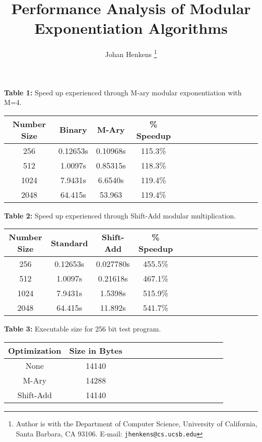 \documentclass[twocolumn]{IEEEtran}
\begin{document}
\title{Performance Analysis of Modular \break
Exponentiation Algorithms}


\author{Johan Henkens
\thanks{Author is with the
Department of Computer Science,
University of California, Santa Barbara, CA 93106.
E-mail: \texttt{jhenkens@cs.ucsb.edu}}
}

\maketitle



\begin{center}
\textbf{Table 1:} Speed up experienced through M-ary modular exponentiation with M=4. \\[1em]
\begin{tabular}{|c|c|c|c|c|c|c|c|c|c|c|c|c|c|} \hline
Number Size & Binary & M-Ary & \% Speedup  \\ \hline
256 	& 0.12653s 	& 0.10968s	& 115.3\% \\ \hline
512 	& 1.0097s  	& 0.85315s	& 118.3\% \\ \hline
1024 	& 7.9431s  	& 6.6540s	& 119.4\% \\ \hline
2048 	& 64.415s  	& 53.963	& 119.4\% \\ \hline
\end{tabular}
\end{center}

\begin{center}
\textbf{Table 2:} Speed up experienced through Shift-Add modular multiplication. \\[1em]
\begin{tabular}{|c|c|c|c|c|c|c|c|c|c|c|c|c|c|} \hline
Number Size & Standard & Shift-Add & \% Speedup  \\ \hline
256 	& 0.12653s 	& 0.027780s	& 455.5\% \\ \hline
512 	& 1.0097s  	& 0.21618s	& 467.1\% \\ \hline
1024 	& 7.9431s  	& 1.5398s	& 515.9\% \\ \hline
2048 	& 64.415s  	& 11.892s	& 541.7\% \\ \hline
\end{tabular}
\end{center}

\begin{center}
\textbf{Table 3:} Executable size for 256 bit test program. \\[1em]
\begin{tabular}{|c|c|c|c|c|c|c|c|c|c|c|c|c|c|} \hline
Optimization & Size in Bytes \\ \hline
None 		&  14140 \\ \hline
M-Ary 		&  14288 \\ \hline
Shift-Add 	&  14140 \\ \hline
\end{tabular}
\end{center}
\end{document}
